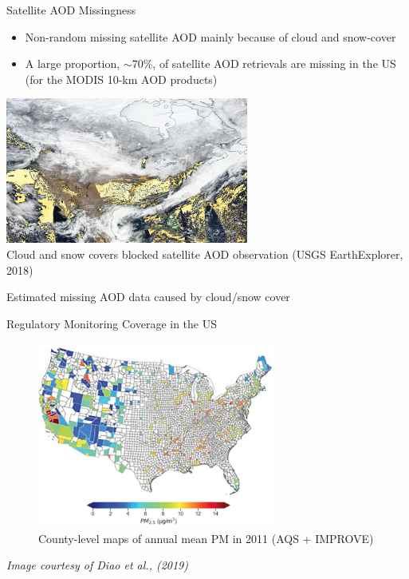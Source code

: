 \begin{frame}{Satellite AOD Missingness}
    \begin{itemize}
        \item Non-random missing satellite AOD mainly because of cloud and snow-cover 
        \item A large proportion, $\sim$70\%, of satellite AOD retrievals are missing in the US (for the MODIS 10-km AOD products)
    \end{itemize}
    \begin{center}
    \includegraphics[width=0.6\textwidth]{img/missing.jpg} \\
    \vspace{-0.2cm}
    {\tiny Cloud and snow covers blocked satellite AOD observation (USGS EarthExplorer, 2018)}
    \end{center}
    \begin{center}
        \color{red} Estimated missing AOD data caused by cloud/snow cover
    \end{center}
\end{frame}

\begin{frame}{Regulatory Monitoring Coverage in the US}
    \begin{figure}
        \centering
        \includegraphics[width=0.7\textwidth]{img/counties.png}
        \caption{\footnotesize County-level maps of annual mean PM in 2011 (AQS + IMPROVE)}
        \label{fig:my_label}
    \end{figure}    
    \vspace{-0.2in}
    \begin{center}
        \tiny\sl Image courtesy of Diao et al., (2019)
    \end{center}
\end{frame}

